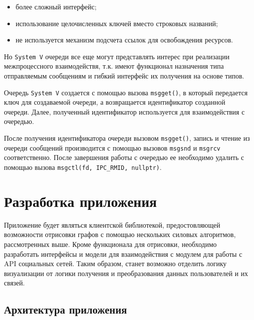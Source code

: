 \documentclass[14pt, russian]{scrartcl}
\begin{document}
\begin{itemize}
  \item более сложный интерфейс;
  \item использование целочисленных ключей вместо строковых названий;
  \item не используется механизм подсчета ссылок для освобождения ресурсов.
\end{itemize}

Но \verb|System V| очереди все еще могут представлять интерес при реализации
межпроцессного взаимодействя, т.к. имеют функционал назначения типа отправляемым
сообщениям и гибкий интерфейс их получения на основе типов.

Очередь \verb|System V| создается с помощью вызова \verb|msgget()|, в который
передается ключ для создаваемой очереди, а возвращается идентификатор созданной
очереди. Далее, полученный идентификатор используется для взаимодействия с
очередью.

После получения идентификатора очереди вызовом \verb|msgget()|, запись и чтение
из очереди сообщений производится с помощью вызовов \verb|msgsnd| и
\verb|msgrcv| соответственно. После завершения работы с очередью ее необходимо
удалить с помощью вызова \verb|msgctl(fd, IPC_RMID, nullptr)|.




\section{Разработка приложения}

Приложение будет являться клиентской библиотекой, предостовляющей возможности
отрисовки графов с помощью нескольких силовых алгоритмов, рассмотренных выше.
Кроме функционала для отрисовки, необходимо разработать интерфейсы и модели для
взаимодействия с модулем для работы с API социальных сетей. Таким образом,
станет возможно отделить логику визуализации от логики получения и
преобразования данных пользователей и их связей.

\subsection{Архитектура приложения}
\end{document}
